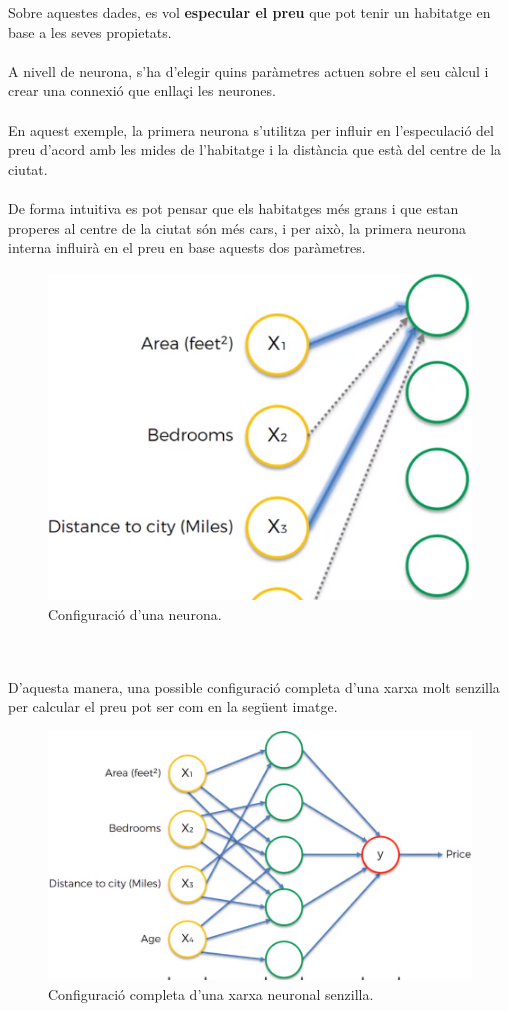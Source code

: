 \documentclass[12pt]{article}
\begin{document}
Sobre aquestes dades, es vol \textbf{especular el preu} que pot tenir un habitatge en base a les seves propietats.
\\\\A nivell de neurona, s'ha d'elegir quins paràmetres actuen sobre el seu càlcul i crear una connexió que enllaçi les neurones. 
\\\\En aquest exemple, la primera neurona s'utilitza per influir en l'especulació del preu d'acord amb les mides de l'habitatge i la distància que està del centre de la ciutat. 
\\\\De forma intuitiva es pot pensar que els habitatges més grans i que estan properes al centre de la ciutat són més cars, i per això, la primera neurona interna influirà en el preu en base aquests dos paràmetres.
\begin{figure}[h!]
	\centering
	\includegraphics[scale=0.3]{imatges/funcionament/1basic.png}
	\caption{Configuració d'una neurona.}
\end{figure}
\pagebreak
\\\\D'aquesta manera, una possible configuració completa d'una xarxa molt senzilla per calcular el preu pot ser com en la següent imatge.
\begin{figure}[h!]
	\centering
	\includegraphics[scale=0.3]{imatges/funcionament/2completa.png}
	\caption{Configuració completa d'una xarxa neuronal senzilla.}
\end{figure}
\end{document}
